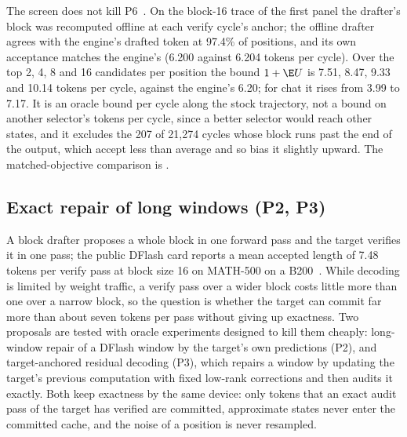 The screen does not kill P6~. On the block-16 trace of the first panel the drafter's block was recomputed offline at each verify cycle's anchor; the offline drafter agrees with the engine's drafted token at 97.4\% of positions, and its own acceptance matches the engine's (6.200 against 6.204 tokens per cycle). Over the top 2, 4, 8 and 16 candidates per position the bound $1+\E U$ is 7.51, 8.47, 9.33 and 10.14 tokens per cycle, against the engine's 6.20; for chat it rises from 3.99 to 7.17. It is an oracle bound per cycle along the stock trajectory, not a bound on another selector's tokens per cycle, since a better selector would reach other states, and it excludes the 207 of 21,274 cycles whose block runs past the end of the output, which accept less than average and so bias it slightly upward. The matched-objective comparison is .

\subsection{Exact repair of long windows (P2, P3)}\label{app:repair}\label{sec:repair}
A block drafter proposes a whole block in one forward pass and the target verifies it in one pass; the public DFlash card reports a mean accepted length of 7.48 tokens per verify pass at block size 16 on MATH-500 on a B200~\cite{dflash4bcard}. While decoding is limited by weight traffic, a verify pass over a wider block costs little more than one over a narrow block, so the question is whether the target can commit far more than about seven tokens per pass without giving up exactness. Two proposals are tested with oracle experiments designed to kill them cheaply: long-window repair of a DFlash window by the target's own predictions (P2), and target-anchored residual decoding (P3), which repairs a window by updating the target's previous computation with fixed low-rank corrections and then audits it exactly. Both keep exactness by the same device: only tokens that an exact audit pass of the target has verified are committed, approximate states never enter the committed cache, and the noise of a position is never resampled.

